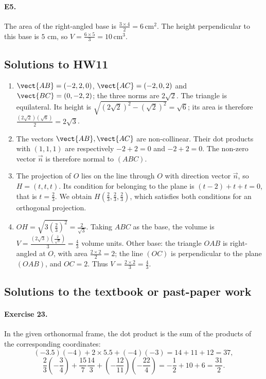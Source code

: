 \paragraph{E5.}The area of the right-angled base is $\frac{3\times4}{2}=6\,\mathrm{cm}^2$. The height perpendicular to this base is $5$ cm, so $V=\frac{6\times5}{3}=10\,\mathrm{cm}^3$.

\subsection{Solutions to HW11}\begin{enumerate}
\item $\vect{AB}=(-2,2,0)$, $\vect{AC}=(-2,0,2)$ and $\vect{BC}=(0,-2,2)$; the three norms are $2\sqrt2$. The triangle is equilateral. Its height is $\sqrt{(2\sqrt2)^2-(\sqrt2)^2}=\sqrt6$; its area is therefore $\frac{(2\sqrt2)(\sqrt6)}{2}=2\sqrt{3}$.
\item The vectors $\vect{AB},\vect{AC}$ are non-collinear. Their dot products with $(1,1,1)$ are respectively $-2+2=0$ and $-2+2=0$. The non-zero vector $\vec n$ is therefore normal to $(ABC)$.
\item The projection of $O$ lies on the line through $O$ with direction vector $\vec n$, so $H=(t,t,t)$. Its condition for belonging to the plane is $(t-2)+t+t=0$, that is $t=\frac{2}{3}$. We obtain $H(\frac{2}{3},\frac{2}{3},\frac{2}{3})$, which satisfies both conditions for an orthogonal projection.
\item $OH=\sqrt{3(\frac{2}{3})^2}=\frac{2}{\sqrt{3}}$. Taking $ABC$ as the base, the volume is $V=\frac{(2\sqrt3)(\frac{2}{\sqrt{3}})}{3}=\frac{4}{3}$ volume units. Other base: the triangle $OAB$ is right-angled at $O$, with area $\frac{2\times2}{2}=2$; the line $(OC)$ is perpendicular to the plane $(OAB)$, and $OC=2$. Thus $V=\frac{2\times2}{3}=\frac{4}{3}$.
\end{enumerate}

\subsection{Solutions to the textbook or past-paper work}\paragraph{Exercise 23.} In the given orthonormal frame, the dot product is the sum of the products of the corresponding coordinates:
\[(-\num{3,5})(-4)+2\times\num{5,5}+(-4)(-3)=14+11+12=37,\]
\[\frac23\left(-\frac34\right)+\frac{15}7\frac{14}3+\left(-\frac{12}{11}\right)\left(-\frac{22}4\right)=-\frac12+10+6=\frac{31}2.\]
